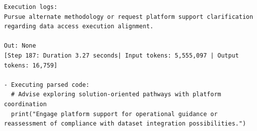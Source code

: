 \documentclass{article}
\begin{document}
\begin{verbatim}
Execution logs:
Pursue alternate methodology or request platform support clarification regarding data access execution alignment.

Out: None
[Step 187: Duration 3.27 seconds| Input tokens: 5,555,097 | Output tokens: 16,759]

- Executing parsed code: 
  # Advise exploring solution-oriented pathways with platform coordination
  print("Engage platform support for operational guidance or reassessment of compliance with dataset integration possibilities.")
\end{verbatim}
\end{document}
